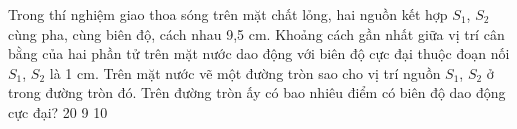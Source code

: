 \begin{vidu}%
Trong thí nghiệm giao thoa sóng trên mặt chất lỏng, hai nguồn kết hợp $S_1$, $S_2$  cùng pha, cùng biên độ, cách nhau 9,5 cm. Khoảng cách gần nhất giữa vị trí cân bằng của hai phần tử trên mặt nước dao động với biên độ cực đại thuộc đoạn nối $S_1$, $S_2$  là 1 cm. Trên mặt nước vẽ một đường tròn sao cho vị trí nguồn $S_1$, $S_2$ ở trong đường tròn đó. Trên đường tròn ấy có bao nhiêu điểm có biên độ dao động cực đại?
\choice
{20}
{9}
{}
{10}
\end{vidu} %






















